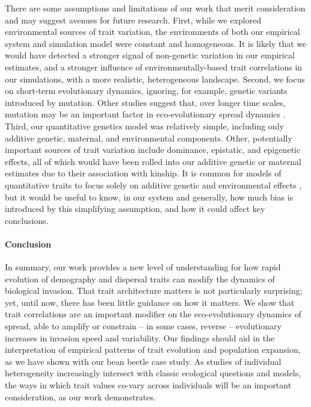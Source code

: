 \documentclass[11pt]{article}
\begin{document}
There are some assumptions and limitations of our work that merit consideration and may suggest avenues for future research.
First, while we explored environmental sources of trait variation, the environments of both our empirical system and simulation model were constant and homogeneous.
It is likely that we would have detected a stronger signal of non-genetic variation in our empirical estimates, and  a stronger influence of environmentally-based trait correlations in our simulations, with a more realistic, heterogeneous landscape.
Second, we focus on short-term evolutionary dynamics, ignoring, for example, genetic variants introduced by mutation.
Other studies suggest that, over longer time scales, mutation may be an important factor in eco-evolutionary spread dynamics \citep{fronhofer_eco-evolutionary_2015,shaw_dispersal_2015,burton_trade-offs_2010,peischl2018evolution}.
Third, our quantitative genetics model was relatively simple, including only additive genetic, maternal, and environmental components.
Other, potentially important sources of trait variation include dominance, epistatic, and epigenetic effects, all of which would have been rolled into our additive genetic or maternal estimates due to their association with kinship.
It is common for models of quantitative traits to focus solely on additive genetic and environmental effects \citep{wilson_ecologists_2010}, but it would be useful to know, in our system and generally, how much bias is introduced by this simplifying assumption, and how it could affect key conclusions.

\paragraph*{Conclusion}
In summary, our work provides a new level of understanding for how rapid evolution of demography and dispersal traits can modify the dynamics of biological invasion.
That trait architecture matters is not particularly surprising; yet, until now, there has been little guidance on how it matters.
We show that trait correlations are an important modifier on the eco-evolutionary dynamics of spread, able to amplify or constrain -- in some cases, reverse -- evolutionary increases in invasion speed and variability.
Our findings should aid in the interpretation of empirical patterns of trait evolution and population expansion, as we have shown with our bean beetle case study.
As studies of individual heterogeneity increasingly intersect with classic ecological questions and models, the ways in which trait values co-vary across individuals will be an important consideration, as our work demonstrates.
\end{document}
